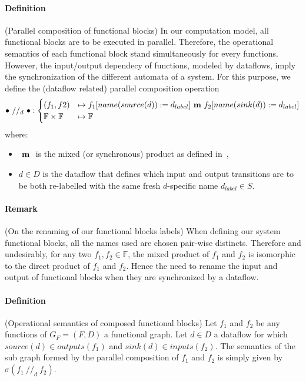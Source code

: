 \documentclass{article}
\newcommand{\mprod}{\text{ \textbf{m} }}
\begin{document}
\paragraph{Definition} (Parallel composition of functional blocks) In our computation model, all functional blocks are to be executed in parallel. Therefore, the operational semantics of each functional block stand simultaneously for every functions. However, the input/output dependecy of functions, modeled by dataflows, imply the synchronization of the different automata of a system. For this purpose, we define the (dataflow related) parallel composition operation
\begin{align}
    \bullet ~//_d~ \bullet : 
    \begin{cases}
        (f_1, f2) &\mapsto f_1[name(source(d)):=d_{label}] \mprod f_2[name(sink(d)):=d_{label}]\\
        \mathbb{F} \times \mathbb{F} &\mapsto \mathbb{F}
    \end{cases}
\end{align}
where: 
\begin{itemize}
    \item $\mprod$ is the mixed (or synchronous) product as defined in~\cite{duboc_mixed_1986},
    \item $d \in D$ is the dataflow that defines which input and output transitions are to be both re-labelled with the same fresh $d$-specific name $d_{label} \in S$.
\end{itemize}

\paragraph{Remark} (On the renaming of our functional blocks labels) When defining our system functional blocks, all the names used are chosen pair-wise distincts. Therefore and undesirably, for any two $f_1, f_2 \in \mathbb{F}$, the mixed product of $f_1$ and $f_2$ is isomorphic to the direct product of $f_1$ and $f_2$. Hence the need to rename the input and output of functional blocks when they are synchronized by a dataflow.

\paragraph{Definition} (Operational semantics of composed functional blocks) 
Let $f_1$ and $f_2$ be any functions of $G_F = (F, D)$ a functional graph. Let $d \in D$ a dataflow for which $source(d) \in outputs(f_1)$ and $sink(d) \in inputs(f_2)$. The semantics of the sub graph formed by the parallel composition of $f_1$ and $f_2$ is simply given by $\sigma(f_1 ~//_d~ f_2)$.\\
\end{document}
